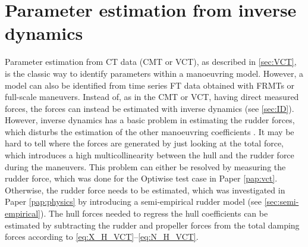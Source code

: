 \section{Parameter estimation from inverse dynamics} \label{sec:IDR}
Parameter estimation from CT data (CMT or VCT), as described in \autoref{sec:VCT}, is the classic way to identify parameters within a manoeuvring model. However, a model can also be identified from time series FT data obtained with FRMTs or full-scale maneuvers. Instead of, as in the CMT or VCT, having direct measured forces, the forces can instead be estimated with inverse dynamics (see \autoref{sec:ID}). However, inverse dynamics has a basic problem in estimating the rudder forces, which disturbs the estimation of the other manoeuvring coefficients \cite{arakiEstimatingManeuveringCoefficients2012}. It may be hard to tell where the forces are generated by just looking at the total force, which introduces a high multicollinearity between the hull and the rudder force during the maneuvers.
This problem can either be resolved by measuring the rudder force, which was done for the Optiwise test case in Paper \ref{pap:vct}. Otherwise, the rudder force needs to be estimated, which was investigated in Paper \ref{pap:physics} by introducing a semi-empirical rudder model (see \autoref{sec:semi-empirical}). The hull forces needed to regress the hull coefficients can be estimated by subtracting the rudder and propeller forces from the total damping forces according to \autoref{eq:X_H_VCT}--\autoref{eq:N_H_VCT}.



